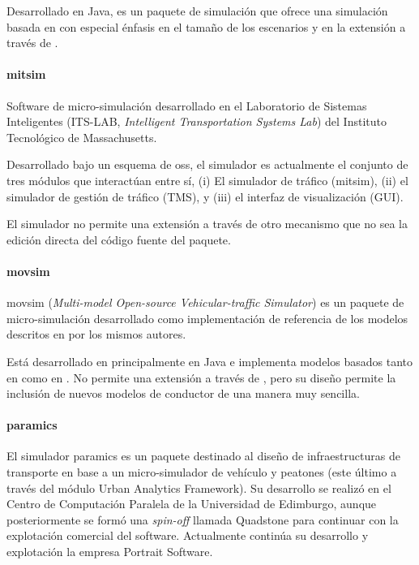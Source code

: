Desarrollado en Java, es un paquete de simulación que ofrece una simulación basada en  con especial énfasis en el tamaño de los escenarios y en la extensión a través de .

\paragraph{\gls{mitsim}}

Software de micro-simulación desarrollado en el Laboratorio de Sistemas Inteligentes (ITS-LAB, \textit{Intelligent Transportation Systems Lab}) del Instituto Tecnológico de Massachusetts.

Desarrollado bajo un esquema de \acrshort{oss}, el simulador es actualmente el conjunto de tres módulos que interactúan entre sí, (i) El simulador de tráfico (\gls{mitsim}), (ii) el simulador de gestión de tráfico (TMS), y (iii) el interfaz de visualización (GUI).

El simulador no permite una extensión a través de otro mecanismo que no sea la edición directa del código fuente del paquete.

\paragraph{\gls{movsim}}

\gls{movsim} (\textit{Multi-model Open-source Vehicular-traffic Simulator}) es un paquete de micro-simulación desarrollado como implementación de referencia de los modelos descritos en \cite{kesting2013traffic} por los mismos autores.

Está desarrollado en principalmente en Java e implementa modelos basados tanto en  como en . No permite una extensión a través de , pero su diseño permite la inclusión de nuevos modelos de conductor de una manera muy sencilla.

\paragraph{\gls{paramics}}

El simulador \gls{paramics} es un paquete destinado al diseño de infraestructuras de transporte en base a un micro-simulador de vehículo y peatones (este último a través del módulo Urban Analytics Framework). Su desarrollo se realizó en el Centro de Computación Paralela de la Universidad de Edimburgo, aunque posteriormente se formó una \textit{spin-off} llamada Quadstone para continuar con la explotación comercial del software. Actualmente continúa su desarrollo y explotación la empresa Portrait Software.

